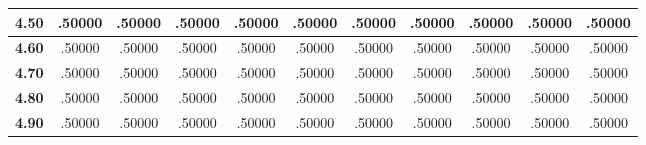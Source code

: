 \begin{tabular}{|c|c|c|c|c|c|c|c|c|c|c|}
\hline
\textbf{ 4.50 } & .50000 & .50000 & .50000 & .50000 & .50000 & .50000 & .50000 & .50000 & .50000 & .50000\\ 
\hline
\textbf{ 4.60 } & .50000 & .50000 & .50000 & .50000 & .50000 & .50000 & .50000 & .50000 & .50000 & .50000\\ 
\hline
\textbf{ 4.70 } & .50000 & .50000 & .50000 & .50000 & .50000 & .50000 & .50000 & .50000 & .50000 & .50000\\ 
\hline
\textbf{ 4.80 } & .50000 & .50000 & .50000 & .50000 & .50000 & .50000 & .50000 & .50000 & .50000 & .50000\\ 
\hline
\textbf{ 4.90 } & .50000 & .50000 & .50000 & .50000 & .50000 & .50000 & .50000 & .50000 & .50000 & .50000\\ 
\hline
\end{tabular}
